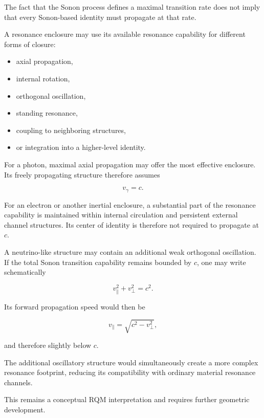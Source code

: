\documentclass[11pt,a4paper]{article}
\begin{document}
The fact that the Sonon process defines a maximal transition rate does not imply that every Sonon-based identity must propagate at that rate.

A resonance enclosure may use its available resonance capability for different forms of closure:

\begin{itemize}
    \item axial propagation,
    \item internal rotation,
    \item orthogonal oscillation,
    \item standing resonance,
    \item coupling to neighboring structures,
    \item or integration into a higher-level identity.
\end{itemize}

For a photon, maximal axial propagation may offer the most effective enclosure. Its freely propagating structure therefore assumes

\begin{equation}
    v_{\gamma}=c.
\end{equation}

For an electron or another inertial enclosure, a substantial part of the resonance capability is maintained within internal circulation and persistent external channel structures. Its center of identity is therefore not required to propagate at $c$.

A neutrino-like structure may contain an additional weak orthogonal oscillation. If the total Sonon transition capability remains bounded by $c$, one may write schematically

\begin{equation}
    v_{\parallel}^{2}
    +
    v_{\perp}^{2}
    =
    c^{2}.
\end{equation}

Its forward propagation speed would then be

\begin{equation}
    v_{\parallel}
    =
    \sqrt{c^{2}-v_{\perp}^{2}},
\end{equation}

and therefore slightly below $c$.

The additional oscillatory structure would simultaneously create a more complex resonance footprint, reducing its compatibility with ordinary material resonance channels.

This remains a conceptual RQM interpretation and requires further geometric development.
\end{document}
